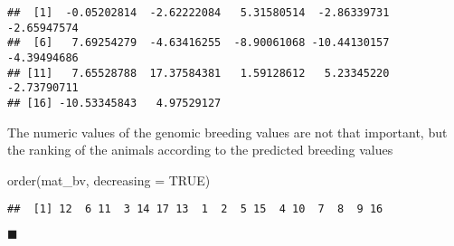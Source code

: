 \documentclass[
]{article}
\newenvironment{Shaded}{\begin{snugshade}}{\end{snugshade}}
\newcommand{\AttributeTok}[1]{\textcolor[rgb]{0.77,0.63,0.00}{#1}}
\newcommand{\ConstantTok}[1]{\textcolor[rgb]{0.00,0.00,0.00}{#1}}
\newcommand{\FunctionTok}[1]{\textcolor[rgb]{0.00,0.00,0.00}{#1}}
\newcommand{\NormalTok}[1]{#1}
\newcommand{\solend}
{\vspace{2ex}$\blacksquare$}
\begin{document}
\begin{verbatim}
##  [1]  -0.05202814  -2.62222084   5.31580514  -2.86339731  -2.65947574
##  [6]   7.69254279  -4.63416255  -8.90061068 -10.44130157  -4.39494686
## [11]   7.65528788  17.37584381   1.59128612   5.23345220  -2.73790711
## [16] -10.53345843   4.97529127
\end{verbatim}

The numeric values of the genomic breeding values are not that
important, but the ranking of the animals according to the predicted
breeding values

\begin{Shaded}
\begin{Highlighting}[]
\FunctionTok{order}\NormalTok{(mat\_bv, }\AttributeTok{decreasing =} \ConstantTok{TRUE}\NormalTok{)}
\end{Highlighting}
\end{Shaded}

\begin{verbatim}
##  [1] 12  6 11  3 14 17 13  1  2  5 15  4 10  7  8  9 16
\end{verbatim}

\solend
\end{document}

